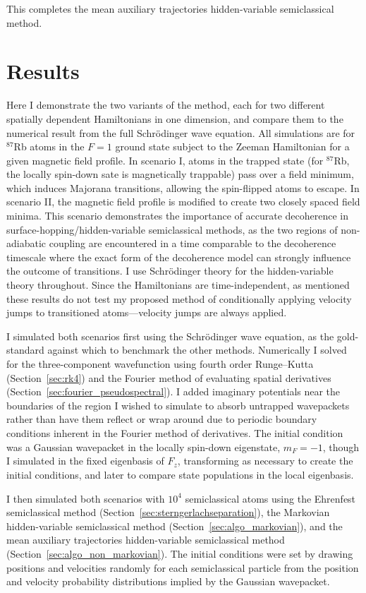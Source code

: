 This completes the mean auxiliary trajectories hidden-variable semiclassical method.

\section{Results}\label{sec:HVSC_results}

Here I demonstrate the two variants of the method, each for two different spatially dependent Hamiltonians in one dimension, and compare them to the numerical result from the full Schr\"odinger wave equation. All simulations are for $^{87}$Rb atoms in the $F=1$ ground state subject to the Zeeman Hamiltonian for a given magnetic field profile. In scenario I, atoms in the trapped state (for $^{87}$Rb, the locally spin-down sate is magnetically trappable) pass over a field minimum, which induces Majorana transitions, allowing the spin-flipped atoms to escape. In scenario II, the magnetic field profile is modified to create two closely spaced field minima. This scenario demonstrates the importance of accurate decoherence in surface-hopping/hidden-variable semiclassical methods, as the two regions of non-adiabatic coupling are encountered in a time comparable to the decoherence timescale where the exact form of the decoherence model can strongly influence the outcome of transitions. I use Schr\"odinger theory for the hidden-variable theory throughout. Since the Hamiltonians are time-independent, as mentioned these results do not test my proposed method of conditionally applying velocity jumps to transitioned atoms---velocity jumps are always applied.

I simulated both scenarios first using the Schr\"odinger wave equation, as the gold-standard against which to benchmark the other methods. Numerically I solved for the three-component wavefunction using fourth order Runge--Kutta (Section~\ref{sec:rk4}) and the Fourier method of evaluating spatial derivatives (Section~\ref{sec:fourier_pseudospectral}). I added imaginary potentials near the boundaries of the region I wished to simulate to absorb untrapped wavepackets rather than have them reflect or wrap around due to periodic boundary conditions inherent in the Fourier method of derivatives. The initial condition was a Gaussian wavepacket in the locally spin-down eigenstate, $m_F = -1$, though I simulated in the fixed eigenbasis of $\hat F_z$, transforming as necessary to create the initial conditions, and later to compare state populations in the local eigenbasis.

I then simulated both scenarios with $10^4$ semiclassical atoms using the Ehrenfest semiclassical method (Section~\ref{sec:sterngerlachseparation}), the Markovian hidden-variable semiclassical method (Section~\ref{sec:algo_markovian}), and the mean auxiliary trajectories hidden-variable semiclassical method (Section~\ref{sec:algo_non_markovian}). The initial conditions were set by drawing positions and velocities randomly for each semiclassical particle from the position and velocity probability distributions implied by the Gaussian wavepacket.

